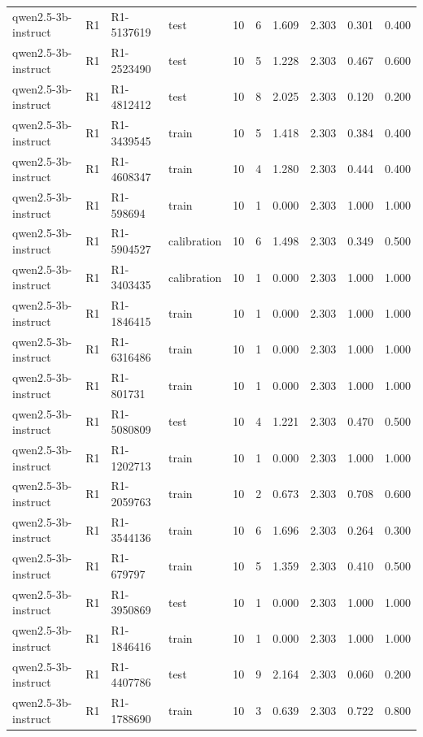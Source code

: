 \begin{table}
\begin{tabular}{llllrrrrrr}
qwen2.5-3b-instruct & R1 & R1-5137619 & test & 10 & 6 & 1.609 & 2.303 & 0.301 & 0.400 \\
qwen2.5-3b-instruct & R1 & R1-2523490 & test & 10 & 5 & 1.228 & 2.303 & 0.467 & 0.600 \\
qwen2.5-3b-instruct & R1 & R1-4812412 & test & 10 & 8 & 2.025 & 2.303 & 0.120 & 0.200 \\
qwen2.5-3b-instruct & R1 & R1-3439545 & train & 10 & 5 & 1.418 & 2.303 & 0.384 & 0.400 \\
qwen2.5-3b-instruct & R1 & R1-4608347 & train & 10 & 4 & 1.280 & 2.303 & 0.444 & 0.400 \\
qwen2.5-3b-instruct & R1 & R1-598694 & train & 10 & 1 & 0.000 & 2.303 & 1.000 & 1.000 \\
qwen2.5-3b-instruct & R1 & R1-5904527 & calibration & 10 & 6 & 1.498 & 2.303 & 0.349 & 0.500 \\
qwen2.5-3b-instruct & R1 & R1-3403435 & calibration & 10 & 1 & 0.000 & 2.303 & 1.000 & 1.000 \\
qwen2.5-3b-instruct & R1 & R1-1846415 & train & 10 & 1 & 0.000 & 2.303 & 1.000 & 1.000 \\
qwen2.5-3b-instruct & R1 & R1-6316486 & train & 10 & 1 & 0.000 & 2.303 & 1.000 & 1.000 \\
qwen2.5-3b-instruct & R1 & R1-801731 & train & 10 & 1 & 0.000 & 2.303 & 1.000 & 1.000 \\
qwen2.5-3b-instruct & R1 & R1-5080809 & test & 10 & 4 & 1.221 & 2.303 & 0.470 & 0.500 \\
qwen2.5-3b-instruct & R1 & R1-1202713 & train & 10 & 1 & 0.000 & 2.303 & 1.000 & 1.000 \\
qwen2.5-3b-instruct & R1 & R1-2059763 & train & 10 & 2 & 0.673 & 2.303 & 0.708 & 0.600 \\
qwen2.5-3b-instruct & R1 & R1-3544136 & train & 10 & 6 & 1.696 & 2.303 & 0.264 & 0.300 \\
qwen2.5-3b-instruct & R1 & R1-679797 & train & 10 & 5 & 1.359 & 2.303 & 0.410 & 0.500 \\
qwen2.5-3b-instruct & R1 & R1-3950869 & test & 10 & 1 & 0.000 & 2.303 & 1.000 & 1.000 \\
qwen2.5-3b-instruct & R1 & R1-1846416 & train & 10 & 1 & 0.000 & 2.303 & 1.000 & 1.000 \\
qwen2.5-3b-instruct & R1 & R1-4407786 & test & 10 & 9 & 2.164 & 2.303 & 0.060 & 0.200 \\
qwen2.5-3b-instruct & R1 & R1-1788690 & train & 10 & 3 & 0.639 & 2.303 & 0.722 & 0.800 \\

\end{tabular}
\end{table}
